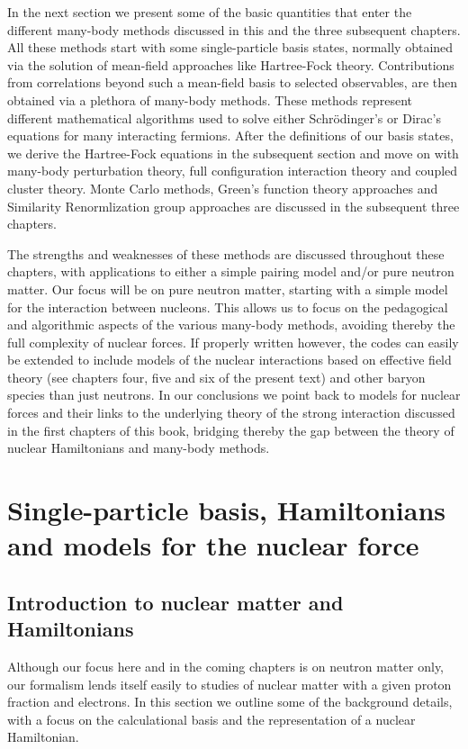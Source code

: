 In the next section we present some of the basic quantities that enter
the different many-body methods discussed in this and the three
subsequent chapters. All these methods start with some single-particle
basis states, normally obtained via the solution of mean-field
approaches like Hartree-Fock theory. Contributions from correlations
beyond such a mean-field basis to selected observables, are then
obtained via a plethora of many-body methods. These methods represent
different mathematical algorithms used to solve either
Schr\"{o}dinger's or Dirac's equations for many interacting
fermions. After the definitions of our basis states, we derive the
Hartree-Fock equations in the subsequent section and move on with
many-body perturbation theory, full configuration interaction theory
and coupled cluster theory.  Monte Carlo methods, Green's function
theory approaches and Similarity Renormlization group approaches are
discussed in the subsequent three chapters.

The strengths and weaknesses of these methods are discussed throughout
these chapters, with applications to either a simple pairing model
and/or pure neutron matter. Our focus will be on pure neutron matter,
starting with a simple model for the interaction between
nucleons. This allows us to focus on the pedagogical and algorithmic
aspects of the various many-body methods, avoiding thereby the full
complexity of nuclear forces.  If properly written however, the codes
can easily be extended to include models of the nuclear interactions
based on effective field theory (see chapters four, five and six of the present text)  and other baryon species
than just neutrons. In our conclusions we point back to models for
nuclear forces and their links to the underlying theory of the strong
interaction discussed in the first chapters of this book, bridging
thereby the gap between the theory of nuclear Hamiltonians and
many-body methods. 


\section{Single-particle basis, Hamiltonians and models for the nuclear force}

\subsection{Introduction to nuclear matter and Hamiltonians}

Although our focus here and in the coming chapters is on neutron matter only, 
our formalism lends itself easily to studies of nuclear  matter 
with a given proton fraction and electrons. In this section we outline some of the background details, with a focus on the calculational basis
and the representation of a nuclear Hamiltonian. 


